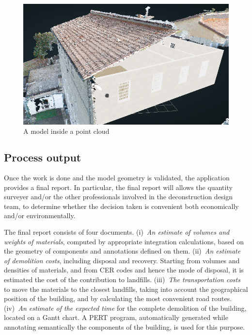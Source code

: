 \begin{figure}[htbp] %
   \centering
   \includegraphics[width=1\linewidth]{images/augmented}
   \caption{A model inside a point cloud}
   \label{fig:augmented}
\end{figure}

\vspace{-3mm}\subsection{Process output}\vspace{-3mm}

\noindent 
Once the work is done and the model geometry is validated, the application provides a final report.
In particular, the final report will allows the quantity surveyer and/or the other professionals involved in the deconstruction design team, to determine whether the decision taken is convenient both economically and/or environmentally.

The final report consists of four documents.
(i)~\emph{An estimate of volumes and weights of materials}, computed by appropriate integration calculations, based on the geometry of components and annotations defined on them.
(ii)~\emph{An estimate of demolition costs}, including disposal and recovery.
Starting from volumes and densities of materials, and from CER codes and hence the mode of disposal, it is estimated the cost of the contribution to landfills.
(iii)~\emph{The transportation costs} to move the materials to the closest landfills, taking into account the geographical position of the building, and by calculating the most convenient road routes.
(iv)~\emph{An estimate of the expected time} for the complete demolition of the building, located on a Gantt chart. A PERT program, automatically generated while annotating semantically the components of the building, is used for this purpose.

\noindent